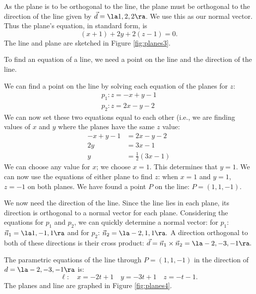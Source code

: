 {As the plane is to be orthogonal to the line, the plane must be orthogonal to the direction of the line given by $\vec d = \la 1,2,2\ra$. We use this as our normal vector. Thus the plane's equation, in standard form, is $$(x+1) +2y+2(z-1)=0.$$ The line and plane are sketched in Figure \ref{fig:planes3}.
}\\

{To find an equation of a line, we need a point on the line and the direction of the line. 

We can find a point on the line by solving each equation of the planes for $z$:
\begin{gather*}
p_1: z = -x+y-1 \\
p_2: z = 2x-y-2
\end{gather*}
We can now set these two equations equal to each other (i.e., we are finding values of $x$ and $y$ where the planes have the same $z$ value:
\begin{align*}
-x+y-1 &= 2x-y-2 \\
2y &= 3x-1\\
y &= \frac12(3x-1)
\end{align*}
We can choose any value for $x$; we choose $x=1$. This determines that $y=1$. We can now use the equations of either plane to find $z$: when $x=1$ and $y=1$, $z=-1$ on both planes. We have found a point $P$  on the line: $P= (1,1,-1)$. 

We now need the direction of the line. Since the line lies in each plane, its direction is orthogonal to a normal vector for each plane. Considering the equations for $p_1$ and $p_2$, we can quickly determine a normal vector: for $p_1$: $\vec n_1 = \la 1,-1,1\ra$ and for $p_2$: $\vec n_2 = \la -2,1,1\ra.$ A direction orthogonal to both of these directions is their cross product: $\vec d = \vec n_1\times \vec n_2 = \la -2,-3,-1\ra.$

The parametric equations of the line through $P=(1,1,-1)$ in the direction of $d=\la -2,-3,-1\ra$ is:
$$\ell: \quad x= -2t+1\quad y = -3t+1\quad z=-t-1.$$
The planes and line are graphed in Figure \ref{fig:planes4}.
}\\

